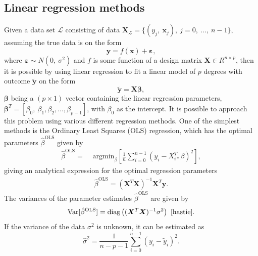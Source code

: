 \documentclass[a4paper, 10pt]{article}
\begin{document}
\begin{multicols}{2}
\subsection{Linear regression methods}
\label{subsec:LinReg}
Given a data set $\mathcal{L}$ consisting of data $\bm{X}_\mathcal{L} = \{(y_j	,\ \bm{x}_j),\ j=0,\ \dots,\ n-1\}$, assuming the true data is on the form
\begin{equation}
\bm{y} = f(\bm{x})+ \bm{\varepsilon} ,
\end{equation}
where $\bm{\varepsilon} \sim N(0,\ \sigma ^2)$ and $f$ is some function of a design matrix $\bm{X}\in R^{n\times p}$, then it is possible by using linear regression to fit a linear model of $p$ degrees with outcome $\bm{\tilde{y}}$ on the form
\begin{equation}
\bm{\tilde{y}} = \bm{X}\bm{\beta},  \label{eq:y=Xbeta}
\end{equation}
$\bm{\beta}$ being a $(p\times 1)$ vector containing the linear regression parameters, $\bm{\beta}^T=[\beta_0,\ \beta_1, \beta_2,\dots,\beta_{p-1}]$, with $\beta_0$ as the intercept.
It is possible to approach this problem using various different regression methods. One of the simplest methods is the Ordinary Least Squares (OLS) regression, which has the optimal parameters $\hat{\beta}^\text{OLS}$ given by
\begin{align}
    \hat{\beta}^\text{OLS} =& \text{ argmin}_{ {\beta} } \left[ \frac{1}{n} \sum_{i=0}^{n-1} (y_i - X_{i*}^T \beta)^2 \right],
    \label{eq:argminbeta_OLS} 
\end{align}
giving an analytical expression for the optimal regression parameters
\begin{align}
    \hat{\beta}^{\text{OLS}} = (\bm{X}^T\bm{X})^{-1} \bm{X}^T \bm{y}.
    \label{eq:beta_OLS}
\end{align}
The variances of the parameter estimates $ \hat{\beta}^{\text{OLS}} $ are given by
\begin{equation}
\label{eq:betavariance}
\text{Var} [\hat{\beta}^{\text{OLS}} ] = \text{diag}\left((\bm{X}^T\bm{X})^{-1}\sigma^2\right) \ \cite{hastie}.
\end{equation}
If the variance of the data $\sigma^2$ is unknown, it can be estimated as 
\begin{equation}
\label{eq:variance}
\hat{\sigma}^2  = \frac{1}{n-p-1}\sum_{i=0}^{n-1}(y_i-\tilde{y}_i)^2.
\end{equation}


\end{multicols}
\end{document}
